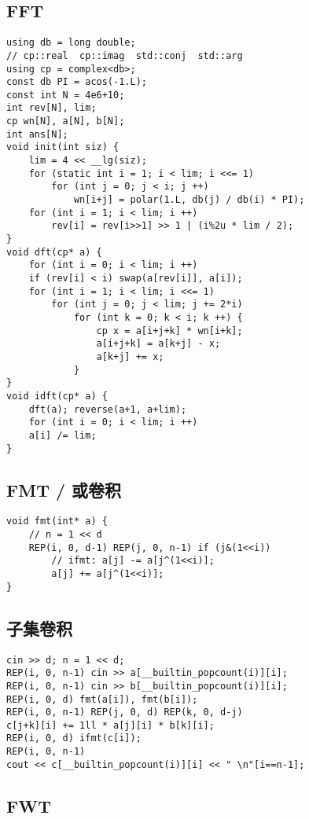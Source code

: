 \documentclass[a4paper,landscape,twocolumn]{ctexart}
\begin{document}
\subsection{FFT}

\begin{lstlisting}
using db = long double;
// cp::real  cp::imag  std::conj  std::arg
using cp = complex<db>;
const db PI = acos(-1.L);
const int N = 4e6+10;
int rev[N], lim;
cp wn[N], a[N], b[N];
int ans[N];
void init(int siz) {
	lim = 4 << __lg(siz);
	for (static int i = 1; i < lim; i <<= 1)
		for (int j = 0; j < i; j ++)
			wn[i+j] = polar(1.L, db(j) / db(i) * PI);
	for (int i = 1; i < lim; i ++)
		rev[i] = rev[i>>1] >> 1 | (i%2u * lim / 2);
}
void dft(cp* a) {
	for (int i = 0; i < lim; i ++)
	if (rev[i] < i) swap(a[rev[i]], a[i]);
	for (int i = 1; i < lim; i <<= 1)
		for (int j = 0; j < lim; j += 2*i)
			for (int k = 0; k < i; k ++) {
				cp x = a[i+j+k] * wn[i+k];
				a[i+j+k] = a[k+j] - x;
				a[k+j] += x;
			}
}
void idft(cp* a) {
	dft(a); reverse(a+1, a+lim);
	for (int i = 0; i < lim; i ++)
	a[i] /= lim;
}
\end{lstlisting}

\subsection{FMT / 或卷积}

\begin{lstlisting}
void fmt(int* a) {
	// n = 1 << d
	REP(i, 0, d-1) REP(j, 0, n-1) if (j&(1<<i))
		// ifmt: a[j] -= a[j^(1<<i)];
		a[j] += a[j^(1<<i)];
}
\end{lstlisting}

\subsection{子集卷积}

\begin{lstlisting}
cin >> d; n = 1 << d;
REP(i, 0, n-1) cin >> a[__builtin_popcount(i)][i];
REP(i, 0, n-1) cin >> b[__builtin_popcount(i)][i];
REP(i, 0, d) fmt(a[i]), fmt(b[i]);
REP(i, 0, n-1) REP(j, 0, d) REP(k, 0, d-j)
c[j+k][i] += 1ll * a[j][i] * b[k][i];
REP(i, 0, d) ifmt(c[i]);
REP(i, 0, n-1)
cout << c[__builtin_popcount(i)][i] << " \n"[i==n-1];
\end{lstlisting}

\subsection{FWT}
\end{document}
